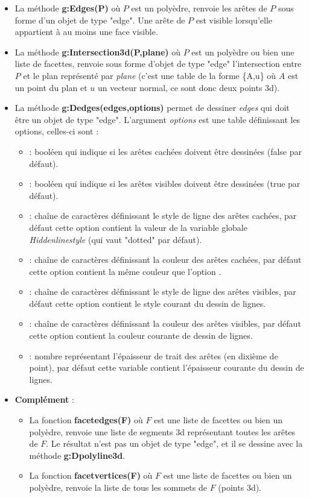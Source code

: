 \documentclass[%
10pt,%
a4paper,%
french,%
]%
{article}%
\begin{document}
\begin{itemize}
    \item La méthode \textbf{g:Edges(P)} où $P$ est un polyèdre, renvoie les arêtes de $P$ sous forme d'un objet de type "edge". Une arête de $P$ est visible lorsqu'elle appartient à au moins une face visible.
    \item La méthode \textbf{g:Intersection3d(P,plane)} où $P$ est un polyèdre ou bien une liste de facettes, renvoie sous forme d'objet de type "edge" l'intersection entre $P$ et le plan représenté par \emph{plane} (c'est une table de la forme \{A,u\} où $A$ est un point du plan et $u$ un vecteur normal, ce sont donc deux points 3d).
    \item La méthode \textbf{g:Dedges(edges,options)} permet de dessiner \emph{edges} qui doit être un objet de type "edge". L'argument \emph{options} est une table définissant les options, celles-ci sont :
    \begin{itemize}
        \item {} : booléen qui indique si les arêtes cachées doivent être dessinées (false par défaut).
        \item {} : booléen qui indique si les arêtes visibles doivent être dessinées (true par défaut).
        \item {} : chaîne de caractères définissant le style de ligne des arêtes cachées, par défaut cette option contient la valeur de la variable globale \emph{Hiddenlinestyle} (qui vaut "dotted" par défaut).
        \item {} : chaîne de caractères définissant la couleur des arêtes cachées, par défaut cette option contient la même couleur que l'option .
        \item {} : chaîne de caractères définissant le style de ligne des arêtes visibles, par défaut cette option contient le style courant du dessin de lignes.
        \item {} : chaîne de caractères définissant la couleur des arêtes visibles, par défaut cette option contient la couleur courante de dessin de lignes.
        \item {} : nombre représentant l'épaisseur de trait des arêtes (en dixième de point), par défaut cette variable contient l'épaisseur courante du dessin de lignes.
    \end{itemize}

    \item \textbf{Complément} : 
        \begin{itemize}
            \item La fonction \textbf{facetedges(F)} où $F$ est une liste de facettes ou bien un polyèdre, renvoie une liste de segments 3d représentant toutes les arêtes de $F$. Le résultat n'est pas un objet de type "edge", et il se dessine avec la méthode \textbf{g:Dpolyline3d}.
            \item La fonction \textbf{facetvertices(F)} où $F$ est une liste de facettes ou bien un polyèdre, renvoie la liste de tous les sommets de $F$ (points 3d).
        \end{itemize}
\end{itemize}
\end{document}
